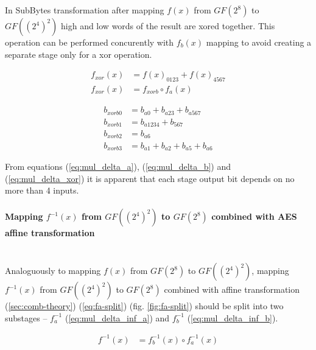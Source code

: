 In SubBytes transformation after mapping $f(x)$ from $GF(2^8)$ to $GF((2^4)^2)$ high and low words of the result are xored together. This operation can be performed concurently with $f_b(x)$ mapping to avoid creating a separate stage only for a xor operation.

\begin{equation}
\begin{aligned}
f_{xor}(x) &= f(x)_{0123} + f(x)_{4567} \\
f_{xor}(x) &= f_{xorb} \circ f_a(x)
\end{aligned}
\end{equation}

\begin{equation}
\label{eq:mul_delta_xor}
\begin{aligned}
b_{xorb0} &= b_{a0} + b_{a23} + b_{a567}       \\
b_{xorb1} &= b_{a1234} + b_{567}               \\
b_{xorb2} &= b_{a6}                            \\
b_{xorb3} &= b_{a1} + b_{a2} + b_{a5} + b_{a6}
\end{aligned}
\end{equation}

From equations (\ref{eq:mul_delta_a}), (\ref{eq:mul_delta_b}) and (\ref{eq:mul_delta_xor}) it is apparent that each stage output bit depends on no more than 4 inputs.




\paragraph{Mapping $f^{-1}(x)$ from $GF((2^4)^2)$ to $GF(2^8)$ combined with AES affine transformation}\mbox{}\\
Analoguously to mapping $f(x)$ from $GF(2^8)$ to $GF((2^4)^2)$, mapping $f^{-1}(x)$ from $GF((2^4)^2)$ to $GF(2^8)$ combined with affine transformation (\ref{sec:comb-theory}) (\ref{eq:fa-split}) (fig. \ref{fig:fa-split}) should be split into two substages --  $f^{-1}_a$ (\ref{eq:mul_delta_inf_a}) and $f^{-1}_b$ (\ref{eq:mul_delta_inf_b}).

\begin{equation}
\label{eq:fa-split}
\begin{aligned}
f^{-1}(x) &= f_b^{-1}(x) \circ f_a^{-1}(x) \\
\end{aligned}
\end{equation}

